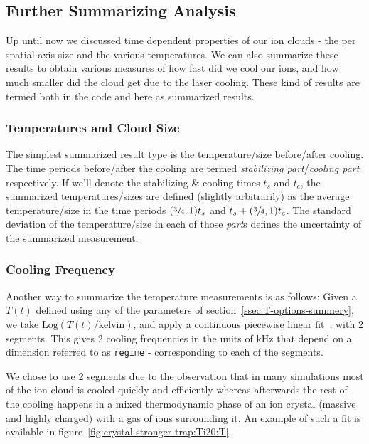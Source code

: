\subsection{Further Summarizing Analysis}\label{ssec:intro/SummarizedMeasurement}

Up until now we discussed time dependent properties of our ion clouds - the per spatial axis size and the various temperatures. We can also summarize these results to obtain various measures of how fast did we cool our ions, and how much smaller did the cloud get due to the laser cooling. These kind of results are termed both in the code and here as summarized results.

\subsubsection{Temperatures and Cloud Size}\label{sec:intro/time-parts}

The simplest summarized result type is the temperature/size before/after cooling. The time periods before/after the cooling are termed \textit{stabilizing part}/\textit{cooling part} respectively. If we'll denote the stabilizing \& cooling times $t_s$ and $t_c$, the summarized temperatures/sizes are defined (slightly arbitrarily) as the average temperature/size in the time periods $(\sfrac{3}{4},1)t_s$ and $t_s + (\sfrac{3}{4}, 1)t_c$. The standard deviation of the temperature/size in each of those \textit{part}s defines the uncertainty of the summarized measurement.

\subsubsection{Cooling Frequency}

Another way to summarize the temperature measurements is as follows: Given a $T(t)$ defined using any of the parameters of section~\ref{ssec:T-options-summery}, we take $\mathrm{Log}(T(t)/\mathrm{kelvin})$, and apply a continuous piecewise linear fit~\cite{pwlf}, with 2 segments. This gives 2 cooling frequencies in the units of $\mathrm{kHz}$ that depend on a dimension referred to as \texttt{regime} - corresponding to each of the segments.

We chose to use 2 segments due to the observation that in many simulations most of the ion cloud is cooled quickly and efficiently whereas afterwards the rest of the cooling happens in a mixed thermodynamic phase of an ion crystal (massive and highly charged) with a gas of ions surrounding it. An example of such a fit is available in figure~\ref{fig:crystal-stronger-trap:Ti20:T}.

